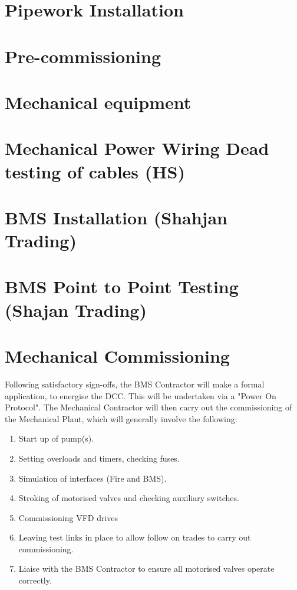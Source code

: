 \section{Pipework Installation}

\section{Pre-commissioning}

\section{Mechanical equipment}

\section{Mechanical Power Wiring Dead testing of cables (HS)}

\section{BMS Installation (Shahjan Trading)}

\section{BMS Point to Point Testing (Shajan Trading)}

\section{Mechanical Commissioning}

Following satisfactory sign-offs, the BMS Contractor will make a formal application, to energise the DCC. This will be undertaken via a "Power On Protocol". The Mechanical Contractor will then carry out the commissioning of the Mechanical Plant, which will generally involve the following:

\begin{enumerate}
\item Start up of pump(s).
\item Setting overloads and timers, checking fuses.
\item Simulation of interfaces (\eg Fire and BMS).
\item Stroking of motorised valves and checking auxiliary switches.
\item Commissioning VFD drives
\item Leaving test links in place to allow follow on trades to carry out commissioning.
\item Liaise with the BMS Contractor to ensure all motorised valves operate correctly.
\end{enumerate}

